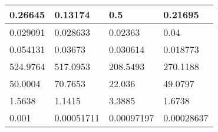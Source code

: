 \begin{tabular}{|l|l|l|l|}
\hline
0.26645&0.13174&0.5&0.21695\\\hline
0.029091&0.028633&0.02363&0.04\\\hline
0.054131&0.03673&0.030614&0.018773\\\hline
524.9764&517.0953&208.5493&270.1188\\\hline
50.0004&70.7653&22.036&49.0797\\\hline
1.5638&1.1415&3.3885&1.6738\\\hline
0.001&0.00051711&0.00097197&0.00028637\\\hline
\end{tabular}
